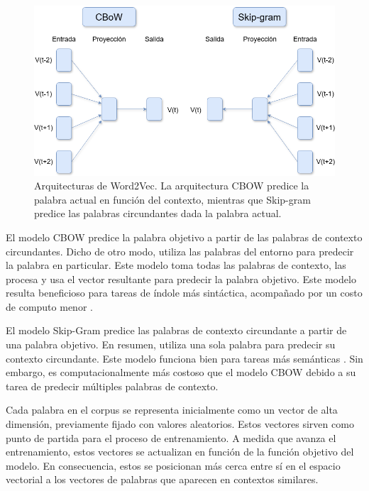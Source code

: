 \begin{figure}[H]
    \centering
    \includegraphics[width=1\textwidth]{imagenes/word2vec.drawio.png}
    \caption{Arquitecturas de Word2Vec. La arquitectura CBOW predice la palabra actual en función del contexto, mientras que Skip-gram predice las palabras circundantes dada la palabra actual.}
    \label{fig:word2vec}
\end{figure}


El modelo CBOW predice la palabra objetivo a partir de las palabras de contexto circundantes. Dicho de otro modo, utiliza las palabras del entorno para predecir la palabra en particular. Este modelo toma todas las palabras de contexto, las procesa y usa el vector resultante para predecir la palabra objetivo. Este modelo resulta beneficioso para tareas de índole más sintáctica, acompañado por un costo de computo menor \parencite{mikolov2013efficientestimationwordrepresentations}.


El modelo Skip-Gram predice las palabras de contexto circundante a partir de una palabra objetivo. En resumen, utiliza una sola palabra para predecir su contexto circundante.
Este modelo funciona bien para tareas más semánticas \parencite{mikolov2013efficientestimationwordrepresentations}. Sin embargo, es computacionalmente más costoso que el modelo CBOW debido a su tarea de predecir múltiples palabras de contexto.


Cada palabra en el corpus se representa inicialmente como un vector de alta dimensión, previamente fijado con valores aleatorios. Estos vectores sirven como punto de partida para el proceso de entrenamiento. A medida que avanza el entrenamiento, estos vectores se actualizan en función de la función objetivo del modelo. En consecuencia, estos se posicionan más cerca entre sí en el espacio vectorial a los vectores de palabras que aparecen en contextos similares.

